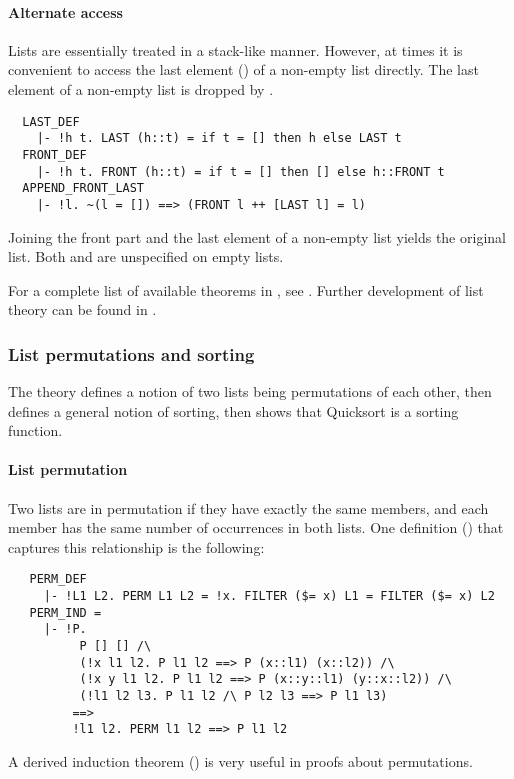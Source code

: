 \paragraph {Alternate access}
%
Lists are essentially treated in a stack-like manner. However, at
times it is convenient to access the last element
() of a non-empty list directly. The last element
of a non-empty list is dropped by .
\begin{hol}
\begin{verbatim}
  LAST_DEF
    |- !h t. LAST (h::t) = if t = [] then h else LAST t
  FRONT_DEF
    |- !h t. FRONT (h::t) = if t = [] then [] else h::FRONT t
  APPEND_FRONT_LAST
    |- !l. ~(l = []) ==> (FRONT l ++ [LAST l] = l)
\end{verbatim}
\end{hol}
%
Joining the front part and the last element of a non-empty list yields
the original list.  Both  and 
are unspecified on empty lists.

\vspace{1ex}
\noindent For a complete list of available theorems in
, see \REFERENCE.  Further development of list
theory can be found in .

\subsubsection{List permutations and sorting}

The  theory defines a notion of two lists being
permutations of each other, then defines a general notion of sorting,
then shows that Quicksort is a sorting function.

\paragraph{List permutation}

Two lists are in permutation if they have exactly the same members,
and each member has the same number of occurrences in both lists. One
definition () that captures this relationship is the
following:
%
\begin{hol}
\begin{verbatim}
   PERM_DEF
     |- !L1 L2. PERM L1 L2 = !x. FILTER ($= x) L1 = FILTER ($= x) L2
   PERM_IND =
     |- !P.
          P [] [] /\
          (!x l1 l2. P l1 l2 ==> P (x::l1) (x::l2)) /\
          (!x y l1 l2. P l1 l2 ==> P (x::y::l1) (y::x::l2)) /\
          (!l1 l2 l3. P l1 l2 /\ P l2 l3 ==> P l1 l3)
         ==>
         !l1 l2. PERM l1 l2 ==> P l1 l2
\end{verbatim}
\end{hol}
%
A derived induction theorem () is very
useful in proofs about permutations.

